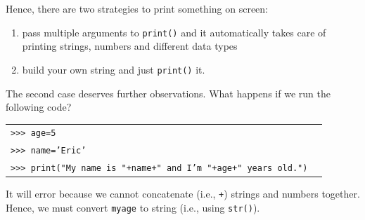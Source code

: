 \documentclass[t,handout,9pt]{beamer}
\begin{document}
\begin{frame}
\vfill
Hence, there are two strategies to print something on screen:
\begin{enumerate}
	\item pass multiple arguments to \texttt{print()} and it automatically takes care of printing strings, numbers and different data types
	\item build your own string and just \texttt{print()} it.
\end{enumerate}
\vfill
The second case deserves further observations.
\vfill
What happens if we run the following code?
\begin{table}[]
\begin{tabular}{ll}
\texttt{>{}>{}> age=5} & \\
\texttt{>{}>{}> name='Eric'} & \\
\texttt{>{}>{}> print("My name is "+name+" and I'm "+age+" years old.")} & \\
\end{tabular}
\end{table}
It will error because we cannot concatenate (i.e., \texttt{+}) strings and numbers together.\\
Hence, we must convert \texttt{myage} to string (i.e., using \texttt{str()}).
\vfill
\end{frame}
%
\end{document}
